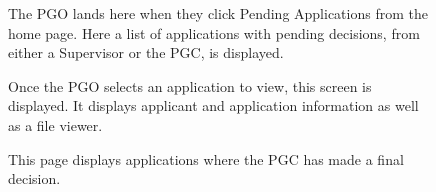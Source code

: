\documentclass[11pt]{article}
\begin{document}
\begin{figure}[H]
	\caption{The PGO lands here when they click Pending Applications from the home page. Here a list of applications with pending decisions, from either a Supervisor or the PGC, is displayed.}
\end{figure}
\begin{figure}[H]
	\caption{Once the PGO selects an application to view, this screen is displayed. It displays applicant and application information as well as a file viewer.}
\end{figure}
\begin{figure}[H]
	\caption{This page displays applications where the PGC has made a final decision.}
\end{figure}
\end{document}
